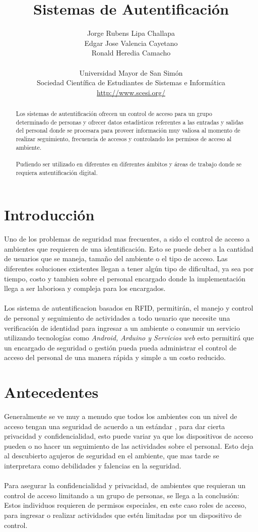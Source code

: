 \documentclass[11pt,twocolumn]{article}
\title{
\vspace{-3cm}   
Sistemas de Autentificaci\'on
}
\author{ 
Jorge Rubens Lipa Challapa\\
Edgar Jose Valencia Cayetano\\
Ronald Heredia Camacho\\
\\
Universidad Mayor de San Sim\'on \\
Sociedad Cient\'ifica de Estudiantes de Sistemas e Inform\'atica\\
\url {http://www.scesi.org/}
}
\date{}
\begin{document}
\maketitle

\begin{abstract} 
Los sistemas de autentificaci\'on ofrecen un control de 
acceso para un grupo determinado de personas y ofrecer datos estad\'isticos 
referentes a las entradas y salidas del personal donde se procesara para 
proveer informaci\'on muy valiosa al momento de realizar seguimiento, 
frecuencia de accesos y controlando los permisos de acceso al ambiente.\\
\\
 Pudiendo ser utilizado en diferentes en diferentes \'ambitos y \'areas de
 trabajo donde se requiera autentificaci\'on digital.
\end{abstract}

\section{Introducci\'on}
Uno de los problemas de seguridad mas frecuentes,  a sido el control de acceso 
a ambientes que requieren de una identificaci\'on. Esto se puede deber a  la 
cantidad de usuarios que se maneja, tama\~no del ambiente o el tipo de acceso. 
Las diferentes soluciones existentes llegan a tener alg\'un tipo de dificultad, 
ya sea por tiempo, costo y tambien sobre el personal encargado donde la 
implementaci\'on llega a ser laboriosa y compleja para los encargados.\\
\\
Los sistema de autentificacion basados en RFID, 
permitir\'an, el manejo y control de personal y seguimiento de actividades a
 todo usuario que necesite una verificaci\'on de identidad para ingresar a un
 ambiente o consumir un servicio utilizando tecnolog\'ias como \textit{Android,
 Arduino y Servicios web} esto permitir\'a que un encargado de seguridad o 
gesti\'on pueda pueda administrar el control de acceso del personal de una 
manera r\'apida y simple a un costo reducido.\\

\section{Antecedentes}

Generalmente se ve muy a menudo que todos los ambientes  con un nivel de acceso 
tengan una seguridad de acuerdo a un est\'andar , para dar cierta privacidad y 
confidencialidad, esto puede variar ya que los dispositivos de acceso pueden o 
no hacer un seguimiento de las actividades sobre el personal. Esto deja al 
descubierto agujeros de seguridad en el ambiente, que mas tarde se interpretara 
como debilidades y falencias en la seguridad.\\
\\
Para asegurar la confidencialidad y privacidad, de ambientes que requieran un 
control de acceso limitando a un grupo de personas, se llega a la conclusi\'on: 
Estos individuos  requieren de permisos especiales, en este caso roles de 
acceso, para ingresar o realizar actividades que est\'en limitadas por un 
dispositivo de control. \\
\end{document}
